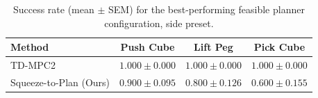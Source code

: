 \begin{table}[t]
\centering
\begin{tabular}{lccc}
\toprule
Method & Push Cube & Lift Peg & Pick Cube \\
\midrule
TD-MPC2 & $1.000 \pm 0.000$ & $1.000 \pm 0.000$ & $1.000 \pm 0.000$ \\
Squeeze-to-Plan (Ours) & $0.900 \pm 0.095$ & $0.800 \pm 0.126$ & $0.600 \pm 0.155$ \\
\bottomrule
\end{tabular}
\caption{Success rate (mean $\pm$ SEM) for the best-performing feasible planner configuration, side preset.}
\label{tab:latency_vs_success_rate_side}
\end{table}
